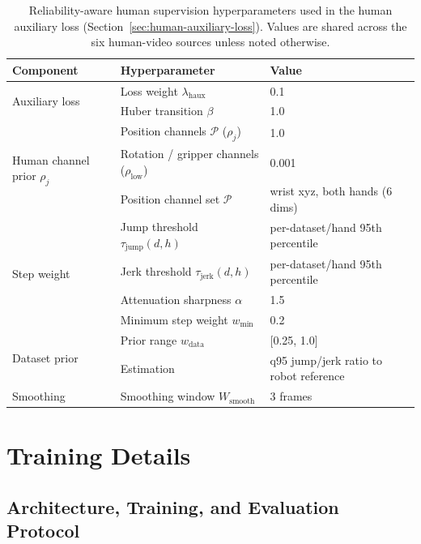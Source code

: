 \documentclass{llmxive}
\providecommand{\arraystretch}{1.1}
\begin{document}
\begin{table}[htbp]
\centering
\small
\renewcommand{\arraystretch}{1.1}
\begin{tabular}{lll}
\toprule
\textbf{Component} & \textbf{Hyperparameter} & \textbf{Value} \\
\midrule
\multirow{2}{*}{Auxiliary loss}
  & Loss weight $\lambda_{\mathrm{haux}}$           & 0.1 \\
  & Huber transition $\beta$                        & 1.0 \\

\midrule
\multirow{3}{*}{Human channel prior $\rho_j$}
  & Position channels $\mathcal{P}$ ($\rho_j$)        & 1.0 \\
  & Rotation / gripper channels ($\rho_{\mathrm{low}}$) & 0.001 \\  %
  & Position channel set $\mathcal{P}$                  & wrist xyz, both hands (6 dims) \\
\midrule
\multirow{4}{*}{Step weight}
  & Jump threshold $\tau_{\mathrm{jump}}(d,h)$      & per-dataset/hand 95th percentile \\
  & Jerk threshold $\tau_{\mathrm{jerk}}(d,h)$      & per-dataset/hand 95th percentile \\
  & Attenuation sharpness $\alpha$                  & 1.5 \\
  & Minimum step weight $w_{\min}$                  & 0.2 \\
\midrule
\multirow{2}{*}{Dataset prior}
  & Prior range $w_{\mathrm{data}}$                 & [0.25, 1.0] \\
  & Estimation                                      & q95 jump/jerk ratio to robot reference \\
\midrule
Smoothing
  & Smoothing window $W_{\mathrm{smooth}}$          & 3 frames \\
\bottomrule
\end{tabular}
\caption{Reliability-aware human supervision hyperparameters used in the
human auxiliary loss (Section~\ref{sec:human-auxiliary-loss}). Values are
shared across the six human-video sources unless noted otherwise.}
\label{tab:reliability-hparams}
\end{table}


\section{Training Details}
\label{app:training-details}

\subsection{Architecture, Training, and Evaluation Protocol}
\label{app:training-details-protocol}
\end{document}
